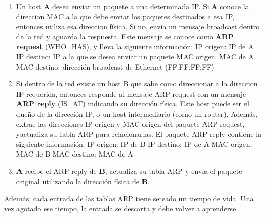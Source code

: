 \begin{enumerate}
	\item Un host \textbf{A} desea enviar un paquete a una determinada IP. Si \textbf{A} conoce la direccion MAC a la que debe enviar los paquetes destinados a esa IP, entonces utiliza esa direccion física. Si no, envía un mensaje broadcast dentro de la red  y aguarda la respuesta. Este mensaje se conoce como \textbf{ARP request} (WHO\_HAS), y lleva la siguiente información:
		\subitem IP origen: IP de A
		\subitem IP destino: IP a la que se desea enviar un paquete
		\subitem MAC origen: MAC de A
		\subitem MAC destino: dirección broadcast de Ethernet (FF:FF:FF:FF)
	\item Si dentro de la red existe un host B que sabe como direccionar a la direccion IP requerida, entonces responde al mensaje ARP request con un mensaje \textbf{ARP reply} (IS\_AT) indicando su dirección física. Este host puede ser el dueño de la dirección IP, o un host intermediario (como un router). Además, extrae las direcciones IP origen y MAC origen del paquete ARP request, yactualiza su tabla ARP para relacionarlas.
	El paquete ARP reply contiene la siguiente información:
		\subitem IP origen: IP de B
		\subitem IP destino: IP de A
		\subitem MAC origen: MAC de B
		\subitem MAC destino: MAC de A
	\item \textbf{A} recibe el ARP reply de \textbf{B}, actualiza su tabla ARP y envía el paquete original utilizando la dirección física de \textbf{B}.
\end{enumerate}
Además, cada entrada de las tablas ARP tiene seteado un tiempo de vida. Una vez agotado ese tiempo, la entrada se descarta y debe volver a aprenderse. 


